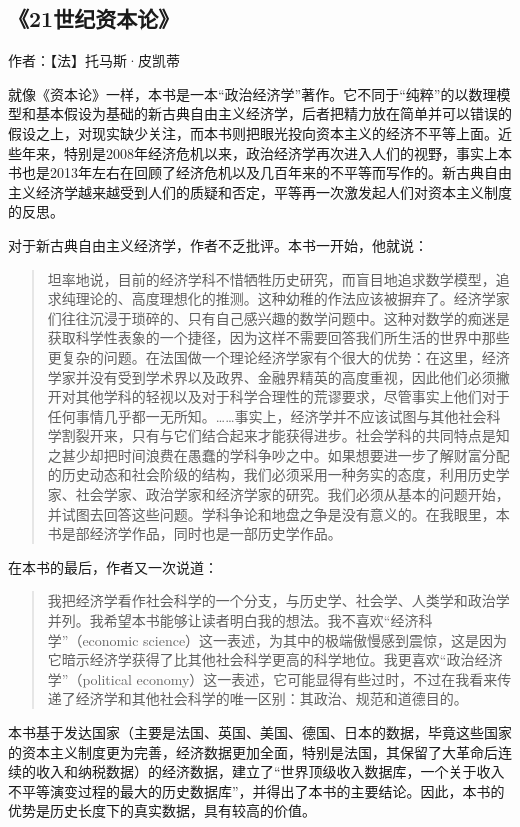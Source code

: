 \subsection{《21世纪资本论》}

作者：【法】托马斯·皮凯蒂

就像《资本论》一样，本书是一本“政治经济学”著作。它不同于“纯粹”的以数理模型和基本假设为基础的新古典自由主义经济学，后者把精力放在简单并可以错误的假设之上，对现实缺少关注，而本书则把眼光投向资本主义的经济不平等上面。近些年来，特别是2008年经济危机以来，政治经济学再次进入人们的视野，事实上本书也是2013年左右在回顾了经济危机以及几百年来的不平等而写作的。新古典自由主义经济学越来越受到人们的质疑和否定，平等再一次激发起人们对资本主义制度的反思。

对于新古典自由主义经济学，作者不乏批评。本书一开始，他就说：
\begin{quotation}
坦率地说，目前的经济学科不惜牺牲历史研究，而盲目地追求数学模型，追求纯理论的、高度理想化的推测。这种幼稚的作法应该被摒弃了。经济学家们往往沉浸于琐碎的、只有自己感兴趣的数学问题中。这种对数学的痴迷是获取科学性表象的一个捷径，因为这样不需要回答我们所生活的世界中那些更复杂的问题。在法国做一个理论经济学家有个很大的优势：在这里，经济学家并没有受到学术界以及政界、金融界精英的高度重视，因此他们必须撇开对其他学科的轻视以及对于科学合理性的荒谬要求，尽管事实上他们对于任何事情几乎都一无所知。……事实上，经济学并不应该试图与其他社会科学割裂开来，只有与它们结合起来才能获得进步。社会学科的共同特点是知之甚少却把时间浪费在愚蠢的学科争吵之中。如果想要进一步了解财富分配的历史动态和社会阶级的结构，我们必须采用一种务实的态度，利用历史学家、社会学家、政治学家和经济学家的研究。我们必须从基本的问题开始，并试图去回答这些问题。学科争论和地盘之争是没有意义的。在我眼里，本书是部经济学作品，同时也是一部历史学作品。
\end{quotation}

在本书的最后，作者又一次说道：
\begin{quotation}
我把经济学看作社会科学的一个分支，与历史学、社会学、人类学和政治学并列。我希望本书能够让读者明白我的想法。我不喜欢“经济科学”（economic science）这一表述，为其中的极端傲慢感到震惊，这是因为它暗示经济学获得了比其他社会科学更高的科学地位。我更喜欢“政治经济学”（political economy）这一表述，它可能显得有些过时，不过在我看来传递了经济学和其他社会科学的唯一区别：其政治、规范和道德目的。
\end{quotation}

本书基于发达国家（主要是法国、英国、美国、德国、日本的数据，毕竟这些国家的资本主义制度更为完善，经济数据更加全面，特别是法国，其保留了大革命后连续的收入和纳税数据）的经济数据，建立了“世界顶级收入数据库，一个关于收入不平等演变过程的最大的历史数据库”，并得出了本书的主要结论。因此，本书的优势是历史长度下的真实数据，具有较高的价值。

